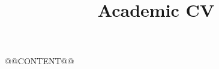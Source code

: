 \documentclass[11pt,a4paper,roman]{moderncv}
\title{Academic CV}
\begin{document}
\makecvtitle
@@CONTENT@@
\end{document}
